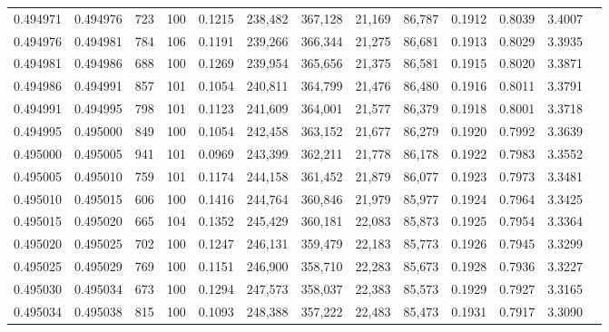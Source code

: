 \begin{tabular}{rrrrrrrrrrrrr}
0.494971 & 0.494976 &   723 & 100 &                                     0.1215 & 238,482 & 367,128 &  21,169 &  86,787 & 0.1912 & 0.8039 & 3.4007 \\
0.494976 & 0.494981 &   784 & 106 &                                     0.1191 & 239,266 & 366,344 &  21,275 &  86,681 & 0.1913 & 0.8029 & 3.3935 \\
0.494981 & 0.494986 &   688 & 100 &                                     0.1269 & 239,954 & 365,656 &  21,375 &  86,581 & 0.1915 & 0.8020 & 3.3871 \\
0.494986 & 0.494991 &   857 & 101 &                                     0.1054 & 240,811 & 364,799 &  21,476 &  86,480 & 0.1916 & 0.8011 & 3.3791 \\
0.494991 & 0.494995 &   798 & 101 &                                     0.1123 & 241,609 & 364,001 &  21,577 &  86,379 & 0.1918 & 0.8001 & 3.3718 \\
0.494995 & 0.495000 &   849 & 100 &                                     0.1054 & 242,458 & 363,152 &  21,677 &  86,279 & 0.1920 & 0.7992 & 3.3639 \\
0.495000 & 0.495005 &   941 & 101 &                                     0.0969 & 243,399 & 362,211 &  21,778 &  86,178 & 0.1922 & 0.7983 & 3.3552 \\
0.495005 & 0.495010 &   759 & 101 &                                     0.1174 & 244,158 & 361,452 &  21,879 &  86,077 & 0.1923 & 0.7973 & 3.3481 \\
0.495010 & 0.495015 &   606 & 100 &                                     0.1416 & 244,764 & 360,846 &  21,979 &  85,977 & 0.1924 & 0.7964 & 3.3425 \\
0.495015 & 0.495020 &   665 & 104 &                                     0.1352 & 245,429 & 360,181 &  22,083 &  85,873 & 0.1925 & 0.7954 & 3.3364 \\
0.495020 & 0.495025 &   702 & 100 &                                     0.1247 & 246,131 & 359,479 &  22,183 &  85,773 & 0.1926 & 0.7945 & 3.3299 \\
0.495025 & 0.495029 &   769 & 100 &                                     0.1151 & 246,900 & 358,710 &  22,283 &  85,673 & 0.1928 & 0.7936 & 3.3227 \\
0.495030 & 0.495034 &   673 & 100 &                                     0.1294 & 247,573 & 358,037 &  22,383 &  85,573 & 0.1929 & 0.7927 & 3.3165 \\
0.495034 & 0.495038 &   815 & 100 &                                     0.1093 & 248,388 & 357,222 &  22,483 &  85,473 & 0.1931 & 0.7917 & 3.3090 \\

\end{tabular}
